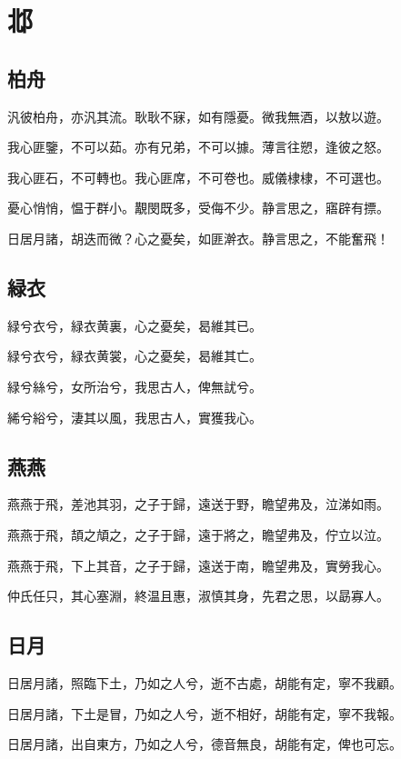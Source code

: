 \section[邶]{邶}

\subsection[柏舟]{柏舟}

汎彼柏舟，亦汎其流。耿耿不寐，如有隱憂。微我無酒，以敖以遊。

我心匪鑒，不可以茹。亦有兄弟，不可以據。薄言往愬，逢彼之怒。

我心匪石，不可轉也。我心匪席，不可卷也。威儀棣棣，不可選也。

憂心悄悄，愠于群小。覯閔既多，受侮不少。静言思之，寤辟有摽。

日居月諸，胡迭而微？心之憂矣，如匪澣衣。静言思之，不能奮飛！

\subsection[緑衣]{緑衣}

緑兮衣兮，緑衣黄裏，心之憂矣，曷維其已。

緑兮衣兮，緑衣黄裳，心之憂矣，曷維其亡。

緑兮絲兮，女所治兮，我思古人，俾無訧兮。

絺兮綌兮，淒其以風，我思古人，實獲我心。

\subsection[燕燕]{燕燕}

燕燕于飛，差池其羽，之子于歸，遠送于野，瞻望弗及，泣涕如雨。

燕燕于飛，頡之頏之，之子于歸，遠于將之，瞻望弗及，佇立以泣。

燕燕于飛，下上其音，之子于歸，遠送于南，瞻望弗及，實勞我心。

仲氏任只，其心塞淵，終温且惠，淑慎其身，先君之思，以勗寡人。

\subsection[日月]{日月}

日居月諸，照臨下土，乃如之人兮，逝不古處，胡能有定，寧不我顧。

日居月諸，下土是冒，乃如之人兮，逝不相好，胡能有定，寧不我報。

日居月諸，出自東方，乃如之人兮，德音無良，胡能有定，俾也可忘。

